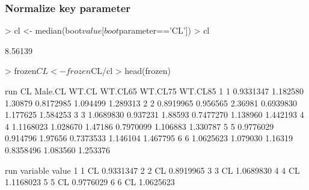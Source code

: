 \subsubsection{Normalize key parameter}
\begin{Schunk}
\begin{Sinput}
> cl <- median(boot$value[boot$parameter=='CL'])
> cl
\end{Sinput}
\begin{Soutput}
[1] 8.56139
\end{Soutput}
\begin{Sinput}
> frozen$CL <- frozen$CL/cl
> head(frozen)
\end{Sinput}
\begin{Soutput}
  run        CL  Male.CL   WT.CL   WT.CL65  WT.CL75  WT.CL85
1   1 0.9331347 1.182580 1.30879 0.8172985 1.094499 1.289313
2   2 0.8919965 0.956565 2.36981 0.6939830 1.177625 1.584253
3   3 1.0689830 0.937231 1.88593 0.7477270 1.138960 1.442193
4   4 1.1168023 1.028670 1.47186 0.7970099 1.106883 1.330787
5   5 0.9776029 0.914796 1.97656 0.7373533 1.146104 1.467795
6   6 1.0625623 1.079030 1.16319 0.8358496 1.083560 1.253376
\end{Soutput}
\begin{Soutput}
  run variable     value
1   1       CL 0.9331347
2   2       CL 0.8919965
3   3       CL 1.0689830
4   4       CL 1.1168023
5   5       CL 0.9776029
6   6       CL 1.0625623
\end{Soutput}
\end{Schunk}
